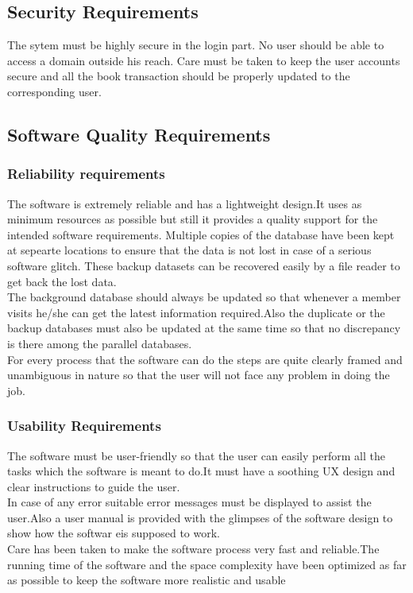 \documentclass{article}
\begin{document}
\subsection{Security Requirements}
The sytem must be highly secure in the login part.
No user should be able to access a domain outside his reach.
Care must be taken to keep the user accounts secure and all the book transaction should be properly updated to the corresponding user.

\subsection{Software Quality Requirements}
\subsubsection{Reliability requirements}
The software is extremely reliable and has a lightweight design.It uses as minimum resources as possible but still it provides a quality support for the intended software requirements.
Multiple copies of the database have been kept at sepearte locations to ensure that the data is not lost in case of a serious software glitch. These backup datasets can be recovered easily by a file reader to get back the lost data.
\\
The background database should always be updated so that whenever a member visits he/she can get the latest information required.Also the duplicate or the backup databases must also be updated at the same time so that no discrepancy is there among the parallel databases.
\\
For every process that the software can do the steps are quite clearly framed and unambiguous in nature so that the user will not face any problem in doing the job.
\subsubsection{Usability Requirements}
The software must be user-friendly so that the user can easily perform all the tasks which the software is meant to do.It must have a soothing UX design and clear instructions to guide the user.
\\In case of any error suitable error messages must be displayed to assist the user.Also a user manual is provided with the glimpses of the software design to show how the softwar eis supposed to work.
\\
Care has been taken to make the software process very fast and reliable.The running time of the software and the space complexity have been optimized as far as possible to keep the software more realistic and usable
\end{document}
